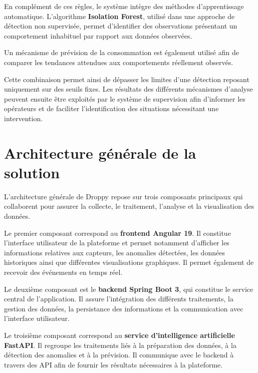 En complément de ces règles, le système intègre des méthodes d'apprentissage
automatique. L'algorithme \textbf{Isolation Forest}, utilisé dans une approche
de détection non supervisée, permet d'identifier des observations présentant
un comportement inhabituel par rapport aux données observées.

Un mécanisme de prévision de la consommation est également utilisé afin de
comparer les tendances attendues aux comportements réellement observés.

Cette combinaison permet ainsi de dépasser les limites d'une détection
reposant uniquement sur des seuils fixes. Les résultats des différents
mécanismes d'analyse peuvent ensuite être exploités par le système de
supervision afin d'informer les opérateurs et de faciliter l'identification
des situations nécessitant une intervention.


\section{Architecture générale de la solution}

L'architecture générale de Droppy repose sur trois composants principaux qui
collaborent pour assurer la collecte, le traitement, l'analyse et la
visualisation des données.

Le premier composant correspond au \textbf{frontend Angular 19}. Il constitue
l'interface utilisateur de la plateforme et permet notamment d'afficher les
informations relatives aux capteurs, les anomalies détectées, les données
historiques ainsi que différentes visualisations graphiques. Il permet
également de recevoir des événements en temps réel.

Le deuxième composant est le \textbf{backend Spring Boot 3}, qui constitue
le service central de l'application. Il assure l'intégration des différents
traitements, la gestion des données, la persistance des informations et la
communication avec l'interface utilisateur.

Le troisième composant correspond au \textbf{service d'intelligence
artificielle FastAPI}. Il regroupe les traitements liés à la préparation des
données, à la détection des anomalies et à la prévision. Il communique avec
le backend à travers des API afin de fournir les résultats nécessaires à la
plateforme.

